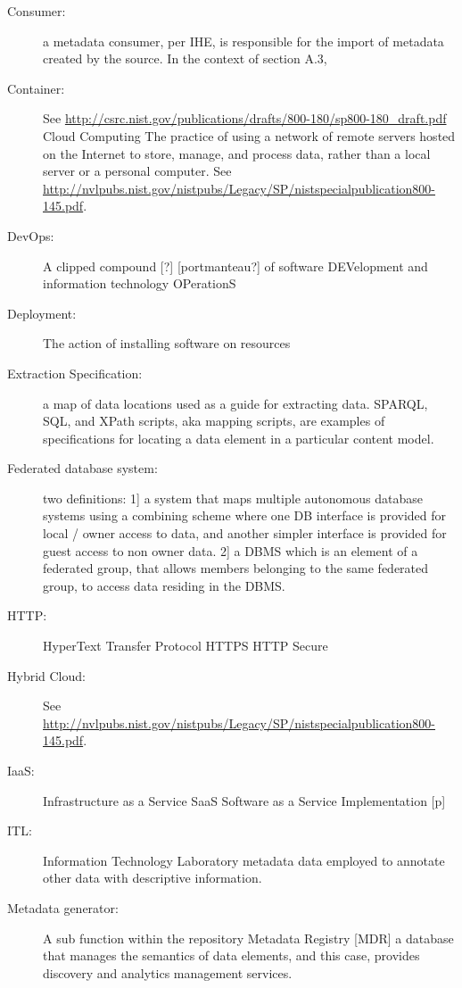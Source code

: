 \begin{description}
\item[Consumer:]		a metadata consumer, per IHE, is responsible for the import of metadata created 			by the source. In the context of section A.3, 

\item[Container:]	See \url{http://csrc.nist.gov/publications/drafts/800-180/sp800-180_draft.pdf}
Cloud Computing	The practice of using a network of remote servers hosted on the Internet to store, manage, and process data, rather than a local server or a personal computer. See \url{http://nvlpubs.nist.gov/nistpubs/Legacy/SP/nistspecialpublication800-145.pdf}.

\item[DevOps:]	A clipped compound [?] [portmanteau?] of software DEVelopment and information technology OPerationS

\item[Deployment:]	The action of installing software on resources

\item[Extraction Specification:]	a map of data locations used as a guide for extracting data. SPARQL, SQL, and XPath scripts, aka mapping scripts, are examples of specifications for locating a data element in a particular content model. 

\item[Federated database system:]	two definitions: 1] a system that maps multiple autonomous database systems using a combining scheme where one DB interface is provided for local / owner access to data, and another simpler interface is provided for guest access to non owner data. 2] a DBMS which is an element of a federated group, that allows members belonging to the same federated group, to access data residing in the DBMS. 

\item[HTTP:]	HyperText Transfer Protocol HTTPS HTTP Secure

\item[Hybrid Cloud:] 	See \url{http://nvlpubs.nist.gov/nistpubs/Legacy/SP/nistspecialpublication800-145.pdf}.

\item[IaaS:]	Infrastructure as a Service SaaS Software as a Service
Implementation [p]

\item[ITL:]	Information Technology Laboratory
metadata	data employed to annotate other data with descriptive information. 

\item[Metadata generator:]	A sub function within the repository
Metadata Registry [MDR]	a database that manages the semantics of data elements, and this case, provides discovery and analytics management services. 


\end{description}
